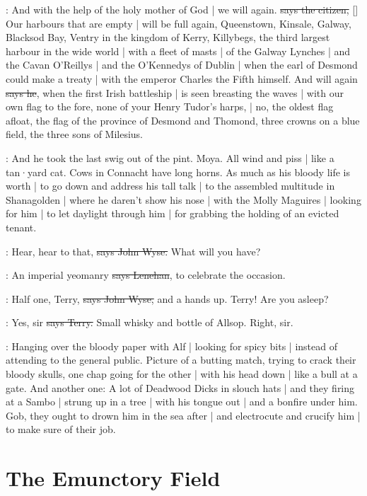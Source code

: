 \citizen:
And with the help of the holy mother of God |
we will again.
\sout{says the citizen,}
[]
Our harbours that are empty |
will be full again,
Queenstown,
Kinsale,
Galway,
Blacksod Bay,
Ventry in the kingdom of Kerry,
Killybegs,
the third largest harbour in the wide world |
with a fleet of masts |
of the Galway Lynches |
and the Cavan O'Reillys |
and the O'Kennedys of Dublin |
when the earl of Desmond
could make a treaty |
with the emperor Charles the Fifth himself.
And will again
\sout{says he},
when the first Irish battleship |
is seen breasting the waves |
with our own flag to the fore,
none of your Henry Tudor's harps, |
no,
the oldest flag afloat,
the flag of the province of Desmond and Thomond,
three crowns on a blue field,
the three sons of Milesius.%

\Nq:
And he took the last swig out of the pint.
Moya.
All wind and piss |
like a tan·yard cat.
Cows in Connacht have long horns.
As much as his bloody life is worth |
to go down and address his tall talk |
to the assembled multitude in Shanagolden |
where he daren't show his nose |
with the Molly Maguires |
looking for him |
to let daylight through him |
for grabbing the holding of an evicted tenant.

\johnwyse:
Hear,
hear to that,
\sout{says John Wyse.}
What will you have?

\lenehan:
An imperial yeomanry
\sout{says Lenehan},
to celebrate the occasion.

\johnwyse:
Half one,
Terry,
\sout{says John Wyse,}
and a hands up.
Terry!
Are you asleep?

\terry:
Yes,
sir
\sout{says Terry.}
Small whisky and bottle of Allsop.
Right,
sir.

\Nq:
Hanging over the bloody paper with Alf |
looking for spicy bits |
instead of attending to the general public.
Picture of a butting match,
trying to crack their bloody skulls,
one chap going for the other |
with his head down |
like a bull at a gate.
And another one:
A lot of Deadwood Dicks in slouch hats |
and they firing at a Sambo |
strung up in a tree |
with his tongue out |
and a bonfire under him.
Gob,
they ought to drown him in the sea after |
and electrocute and crucify him |
to make sure of their job.


\section{The Emunctory Field}

